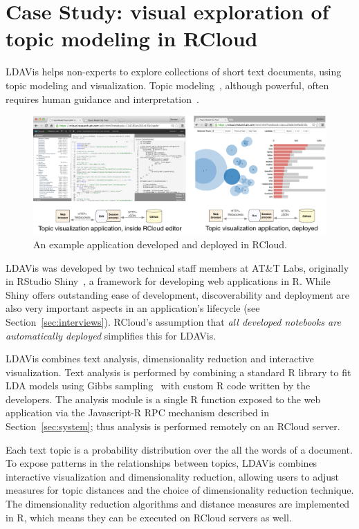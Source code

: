 \section{Case Study\label{sec:casestudy}: visual exploration of topic modeling in RCloud}

LDAVis helps non-experts to explore collections of
short text documents, using topic modeling and
visualization. Topic modeling~\cite{Blei:2003:LDA},
although powerful, often requires human guidance
and interpretation~\cite{Sievert:2014:LAM}.

\begin{figure}
  \includegraphics[width=\linewidth]{fig/casestudytext/casestudytext.pdf}
  \caption{\label{fig:textvis}An example application developed and deployed in RCloud.}
\end{figure}

LDAVis was developed by two technical staff members at
AT\&T Labs, originally in RStudio Shiny~\cite{RStudio:2013:SWA},
a framework for developing web applications in R.
While Shiny offers outstanding ease of development,
discoverability and deployment are also very important aspects
in an application's lifecycle (see Section~\ref{sec:interviews}).
RCloud's assumption that \emph{all developed notebooks are automatically
deployed} simplifies this for LDAVis.

LDAVis combines text analysis, dimensionality reduction and
interactive visualization. Text analysis is performed by
combining a standard R library to fit LDA models using
Gibbs sampling~\cite{} with custom R code written by the
developers. The analysis module is a single R function
exposed to the web application via the Javascript-R RPC
mechanism described in Section~\ref{sec:system};
thus analysis is performed remotely on an RCloud server.

Each text topic is a probability distribution over the all the
words of a document. To expose patterns in the relationships
between topics, LDAVis combines
interactive visualization and dimensionality reduction,
allowing users to adjust measures for topic distances and the choice
of dimensionality reduction technique. The dimensionality reduction
algorithms and distance measures are implemented in R, which
means they can be executed on RCloud servers as well.

